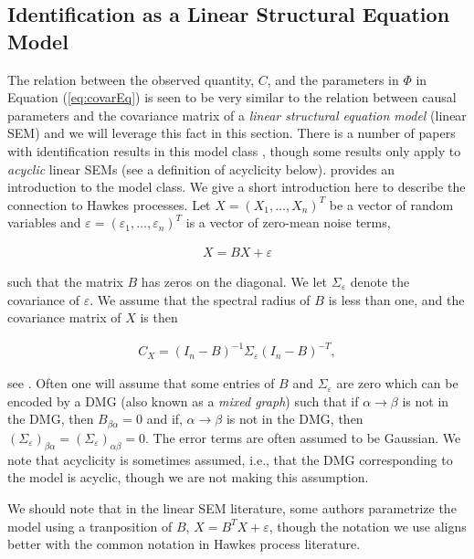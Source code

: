 \documentclass[accepted]{uai2021} %
\begin{document}

\subsection{Identification as a Linear Structural Equation Model}

The relation between the observed quantity, $C$, and the parameters in $\Phi$ 
in 
Equation (\ref{eq:covarEq}) is seen to be very similar to the relation between 
causal parameters and the covariance matrix of a \emph{linear structural 
equation model} (linear SEM) and we will leverage this fact in this section. 
There is 
a number of papers with 
identification results in this model class \citep{brito2002, tian2007, 
tian2009, 
foygelHalftrek2012, 
chenNIPS2016, drton2016, 
weihs2018}, though some results only apply to \emph{acyclic} linear SEMs (see a 
definition of acyclicity below). \cite{bollen1989} provides an introduction to 
the model class. We give a short introduction here to describe the connection 
to 
Hawkes processes. Let $X = (X_1,\ldots,X_n)^T$ be a vector of random variables 
and 
$\varepsilon = 
(\varepsilon_1,\ldots,\varepsilon_n)^T$ is a vector of zero-mean noise terms,

\begin{align}
	X = BX + \varepsilon
	\label{eq:SEM}
\end{align}

such that the matrix $B$ has zeros on the diagonal. We let $\Sigma_\varepsilon$ 
denote the covariance of $\varepsilon$. We assume that the spectral radius of 
$B$ is less than one, and the
covariance matrix of $X$ is then

\begin{align}
C_X = (I_n - B)^{-1}\Sigma_\varepsilon (I_n - B)^{-T},
\label{eq:covSEM}
\end{align}

see \cite{hyttinen2012}. Often one will assume that some entries of $B$ and 
$\Sigma_\varepsilon$ are zero which can be encoded by a DMG (also known as a 
\emph{mixed graph}) such that if 
$\alpha \rightarrow \beta$ is not in the DMG, then $B_{\beta\alpha} = 0$ and 
if, 
$\alpha\rightarrow\beta$ is not in the DMG, then 
$(\Sigma_\varepsilon)_{\beta\alpha} = (\Sigma_\varepsilon)_{\alpha\beta} = 0$. 
The 
error terms are often assumed to be Gaussian. We note that acyclicity is 
sometimes assumed, 
i.e., that the DMG corresponding to the model is 
acyclic, though we are not making 
this assumption.

We should note that in the linear SEM literature, some authors parametrize the 
model using a 
tranposition of $B$, $X = B^TX + \varepsilon$, though the notation we use 
aligns better with the common 
notation 
in Hawkes process literature.
\end{document}
